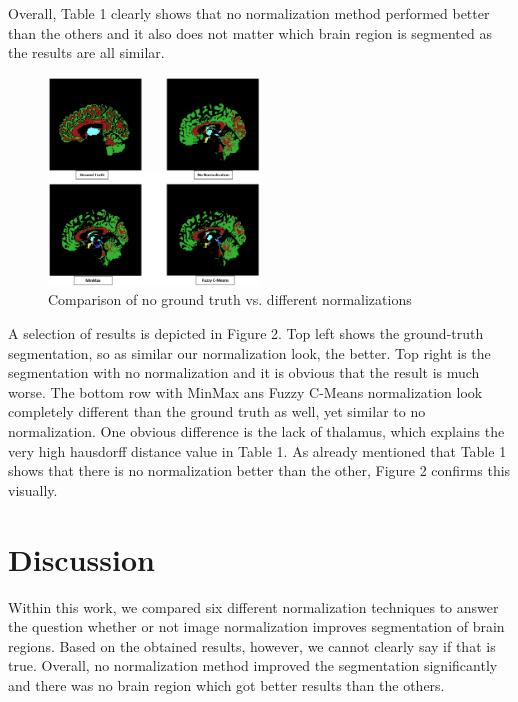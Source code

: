 \documentclass[journal]{IEEEtran}
\begin{document}
Overall, Table 1 clearly shows that no normalization method performed better than the others and it also does not matter which brain region is segmented
as the results are all similar.

	\begin{figure}[h]
		\centering
		\includegraphics[width=0.5\textwidth]{compNorms.png}
		\caption{Comparison of no ground truth vs. different normalizations}
		\label{Figure:e1}
	\end{figure}

A selection of results is depicted in Figure 2. Top left shows the ground-truth segmentation, so as similar our normalization look, the better.
Top right is the segmentation with no normalization and it is obvious that the result is much worse. The bottom row with MinMax ans Fuzzy C-Means
normalization look completely different than the ground truth as well, yet similar to no normalization. One obvious difference is the lack of thalamus, which explains
the very high hausdorff distance value in Table 1. As already mentioned that Table 1 shows that there is no normalization better than the other, 
Figure 2 confirms this visually.


\section{Discussion}
Within this work, we compared six different normalization techniques to answer the question whether or not image normalization improves segmentation of brain regions.
Based on the obtained results, however, we cannot clearly say if that is true. Overall, no normalization method improved the segmentation significantly and there
was no brain region which got better results than the others.\\
\end{document}
